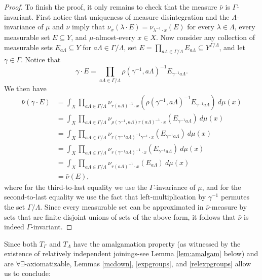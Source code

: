 \documentclass[12pt]{amsart}
\theoremstyle{definition}
\begin{document}
\begin{proof}
	To finish the proof, it only remains to check that the measure $\bar{\nu}$ is $\Gamma$-invariant. First notice that uniqueness of measure disintegration and the $\Lambda$-invariance of $\mu$ and $\nu$ imply that $\nu_x(\lambda \cdot E) = \nu_{\lambda^{-1} \cdot x}(E)$ for every $\lambda \in \Lambda$, every measurable set $E \subseteq Y$, and $\mu$-almost-every $x \in X$. Now consider any collection of measurable sets $E_{a \Lambda} \subseteq Y$ for $a \Lambda \in \Gamma / \Lambda$, set $E = \prod_{a \Lambda \in \Gamma / \Lambda} E_{a \Lambda} \subseteq Y^{\Gamma / \Lambda}$, and let $\gamma \in \Gamma$. Notice that
	\[\gamma \cdot E = \prod_{a \Lambda \in \Gamma / \Lambda} \rho(\gamma^{-1}, a \Lambda)^{-1} E_{\gamma^{-1} a \Lambda}.\]
	We then have
	\begin{align*}
	\bar{\nu}(\gamma \cdot E) & = \int_X \prod_{a \Lambda \in \Gamma / \Lambda} \nu_{r(a \Lambda)^{-1} \cdot x}(\rho(\gamma^{-1}, a \Lambda)^{-1} E_{\gamma^{-1} a \Lambda}) \ d \mu(x)\\
	& = \int_X \prod_{a \Lambda \in \Gamma / \Lambda} \nu_{\rho(\gamma^{-1}, a \Lambda) r(a \Lambda)^{-1} \cdot x}(E_{\gamma^{-1} a \Lambda}) \ d \mu(x)\\
	& = \int_X \prod_{a \Lambda \in \Gamma / \Lambda} \nu_{r(\gamma^{-1} a \Lambda)^{-1} \gamma^{-1} \cdot x}(E_{\gamma^{-1} a \Lambda}) \ d \mu(x)\\
	& = \int_X \prod_{a \Lambda \in \Gamma / \Lambda} \nu_{r(\gamma^{-1} a \Lambda)^{-1} \cdot x}(E_{\gamma^{-1} a \Lambda}) \ d \mu(x)\\
	& = \int_X \prod_{a \Lambda \in \Gamma / \Lambda} \nu_{r(a \Lambda)^{-1} \cdot x}(E_{a \Lambda}) \ d \mu(x)\\
	& = \bar{\nu}(E),
	\end{align*}
	where for the third-to-last equality we use the $\Gamma$-invariance of $\mu$, and for the second-to-last equality we use the fact that left-multiplication by $\gamma^{-1}$ permutes the set $\Gamma / \Lambda$. Since every measurable set can be approximated in $\bar{\nu}$-measure by sets that are finite disjoint unions of sets of the above form, it follows that $\bar{\nu}$ is indeed $\Gamma$-invariant.
\end{proof}

Since both $T_\Gamma$ and $T_\Lambda$ have the amalgamation property (as witnessed by the existence of relatively independent joinings-see Lemma \ref{lem:amalgam} below) and are $\forall\exists$-axiomatizable, Lemmas \ref{mcdown}, \ref{expgroups}, and \ref{relexpgroups} allow us to conclude:
\end{document}
